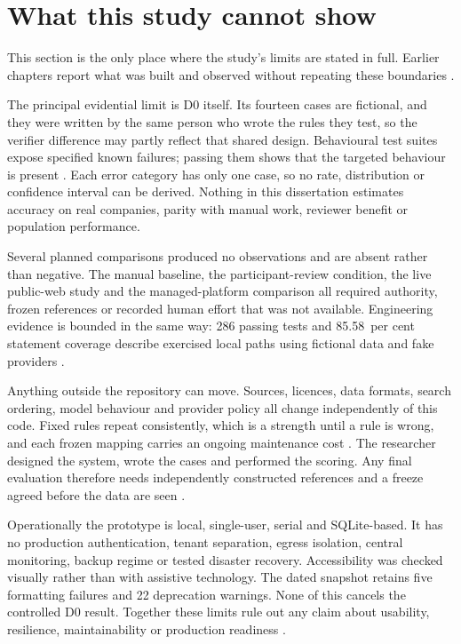 \section{What this study cannot show}
\label{sec:limitations}

This section is the only place where the study's limits are stated in full. Earlier chapters report
what was built and observed without repeating these boundaries
\citep{hevner2004design,nist2023airmf}.

The principal evidential limit is D0 itself. Its fourteen cases are fictional, and they were written
by the same person who wrote the rules they test, so the verifier difference may partly reflect that
shared design. Behavioural test suites expose specified known failures; passing them shows that the
targeted behaviour is present \citep{ribeiro2020checklist,kapoor2023leakage}. Each error category has
only one case, so no rate, distribution or confidence interval can be derived. Nothing in this
dissertation estimates accuracy on real companies, parity with manual work, reviewer benefit or
population performance.

Several planned comparisons produced no observations and are absent rather than negative. The manual
baseline, the participant-review condition, the live public-web study and the managed-platform
comparison all required authority, frozen references or recorded human effort that was not available.
Engineering evidence is bounded in the same way: 286 passing tests and 85.58~per cent statement
coverage describe exercised local paths using fictional data and fake providers
\citep{sculley2015debt,pineau2021reproducibility}.

Anything outside the repository can move. Sources, licences, data formats, search ordering, model
behaviour and provider policy all change independently of this code. Fixed rules repeat consistently,
which is a strength until a rule is wrong, and each frozen mapping carries an ongoing maintenance
cost \citep{sculley2015debt,gebru2021datasheets}. The researcher designed the system, wrote the cases
and performed the scoring. Any final evaluation therefore needs independently constructed references
and a freeze agreed before the data are seen \citep{nist2023airmf,pineau2021reproducibility}.

Operationally the prototype is local, single-user, serial and SQLite-based. It has no production
authentication, tenant separation, egress isolation, central monitoring, backup regime or tested
disaster recovery. Accessibility was checked visually rather than with assistive technology. The
dated snapshot retains five formatting failures and 22 deprecation warnings. None of this cancels
the controlled D0 result. Together these limits rule out any claim about usability, resilience,
maintainability or production readiness
\citep{hevner2004design,amershi2019guidelines}.

